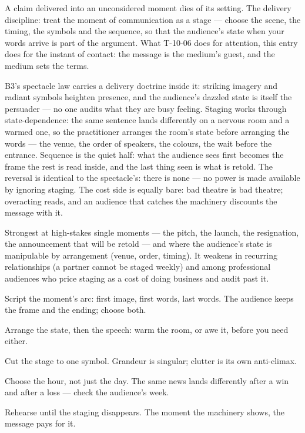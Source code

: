 \begin{core}
A claim delivered into an unconsidered moment dies of its setting. The delivery discipline: treat the moment of communication as a stage --- choose the scene, the timing, the symbols and the sequence, so that the audience's state when your words arrive is part of the argument. What T-10-06 does for attention, this entry does for the instant of contact: the message is the medium's guest, and the medium sets the terms.
\end{core}
\begin{mechanism}
B3's spectacle law carries a delivery doctrine inside it: striking imagery and radiant symbols heighten presence, and the audience's dazzled state is itself the persuader --- no one audits what they are busy feeling. Staging works through state-dependence: the same sentence lands differently on a nervous room and a warmed one, so the practitioner arranges the room's state before arranging the words --- the venue, the order of speakers, the colours, the wait before the entrance. Sequence is the quiet half: what the audience sees first becomes the frame the rest is read inside, and the last thing seen is what is retold. The reversal is identical to the spectacle's: there is none --- no power is made available by ignoring staging. The cost side is equally bare: bad theatre is bad theatre; overacting reads, and an audience that catches the machinery discounts the message with it.
\end{mechanism}
\begin{conditions}
Strongest at high-stakes single moments --- the pitch, the launch, the resignation, the announcement that will be retold --- and where the audience's state is manipulable by arrangement (venue, order, timing). It weakens in recurring relationships (a partner cannot be staged weekly) and among professional audiences who price staging as a cost of doing business and audit past it.
\end{conditions}
\begin{application}
  \item Script the moment's arc: first image, first words, last words. The audience keeps the frame and the ending; choose both.
  \item Arrange the state, then the speech: warm the room, or awe it, before you need either.
  \item Cut the stage to one symbol. Grandeur is singular; clutter is its own anti-climax.
  \item Choose the hour, not just the day. The same news lands differently after a win and after a loss --- check the audience's week.
  \item Rehearse until the staging disappears. The moment the machinery shows, the message pays for it.
\end{application}
